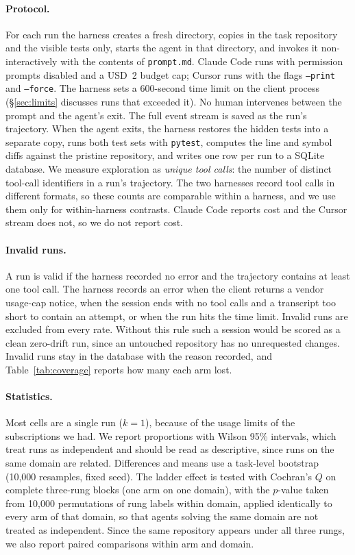 \paragraph{Protocol.} For each run the harness creates a fresh directory,
copies in the task repository and the visible tests only, starts the agent
in that directory, and invokes it non-interactively with the contents of \texttt{prompt.md}. Claude Code
runs with permission prompts disabled and a USD~2 budget cap; Cursor runs
with the flags \texttt{--print} and \texttt{--force}. The harness sets a 600-second time limit on the client process
(\S\ref{sec:limits} discusses runs that exceeded it). No
human intervenes between the prompt and the agent's exit. The full event
stream is saved as the run's trajectory. When the agent exits, the harness
restores the hidden tests into a separate copy, runs both test sets with
\texttt{pytest}, computes the line and symbol diffs against the pristine
repository, and writes one row per run to a SQLite database. We measure
exploration as \emph{unique tool calls}: the number of distinct tool-call
identifiers in a run's trajectory. The two harnesses record tool calls in
different formats, so these counts are comparable within a harness, and we
use them only for within-harness contrasts. Claude Code reports cost and the
Cursor stream does not, so we do not report cost.

\paragraph{Invalid runs.} A run is valid if the harness recorded no error and
the trajectory contains at least one tool call. The harness records an error
when the client returns a vendor usage-cap notice, when the session ends with
no tool calls and a transcript too short to contain an attempt, or when the
run hits the time limit. Invalid runs are excluded from every rate.
Without this rule such a session would be scored as a clean zero-drift run,
since an untouched repository has no unrequested changes. Invalid runs stay in
the database with the reason recorded, and Table~\ref{tab:coverage} reports
how many each arm lost.

\paragraph{Statistics.} Most cells are a single run ($k=1$), because of the
usage limits of the subscriptions we had. We report proportions with Wilson
95\% intervals, which treat runs as independent and should be read as
descriptive, since runs on the same domain are related. Differences and means
use a task-level bootstrap (10{,}000 resamples, fixed seed). The ladder effect is tested with Cochran's $Q$ on complete three-rung
blocks (one arm on one domain), with the $p$-value taken from 10{,}000
permutations of rung labels within domain, applied identically to every arm
of that domain, so that agents solving the same domain are not treated as
independent. Since the same repository appears under all three rungs, we also
report paired comparisons within arm and domain.
